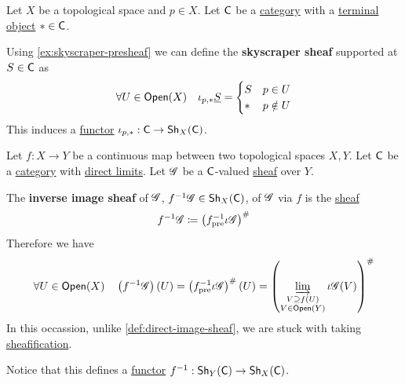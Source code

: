 \documentclass[../../../main]{subfiles}
\begin{document}
\begin{definition} \label{def:skyscraper-sheaf}
  Let \(X\) be a topological space and \(p \in X\).
  Let \(\mathsf{C}\) be a \hyperref[def:category]{category} with a \hyperref[def:initial-terminal-object]{terminal object} \(\ast \in \mathsf{C}\).

  Using \autoref{ex:skyscraper-presheaf} we can define the \textbf{skyscraper sheaf} supported at \(S \in \mathsf{C}\) as
  \begin{align*}
    \forall U \in \mathsf{Open}(X) \quad \iota_{p, \ast}\underline{S} = \begin{cases}
      S & p \in U \\
      \ast & p \notin U
    \end{cases}
  \end{align*}
  This induces a \hyperref[def:functor]{functor} \(\iota_{p, \ast}: \mathsf{C} \to \mathsf{Sh}_{X}(\mathsf{C})\).
\end{definition}

\begin{definition} \label{def:inverse-image-sheaf}
  Let \(f: X \to Y\) be a continuous map between two topological spaces \(X, Y\).
  Let \(\mathsf{C}\) be a \hyperref[def:category]{category} with \hyperref[def:direct-limit]{direct limits}.
  Let \(\mathscr{G}\) be a \(\mathsf{C}\)-valued \hyperref[def:sheaf]{sheaf} over \(Y\).

  The \textbf{inverse image sheaf} of \(\mathscr{G}\), \(f^{-1}\mathscr{G} \in \mathsf{Sh}_{X}(\mathsf{C})\), of \(\mathscr{G}\) via \(f\) is the \hyperref[def:sheaf]{sheaf}
  \begin{equation*}
    f^{-1}\mathscr{G} \coloneq \left( f_{\operatorname{pre}}^{-1} \iota \mathscr{G} \right)^{\#}
  \end{equation*}
  Therefore we have
  \begin{align*}
    \forall U \in \mathsf{Open}(X) \quad \left( f^{-1}\mathscr{G} \right)(U) = \left( f_{\operatorname{pre}}^{-1} \iota \mathscr{G} \right)^{\#}(U) = \left( \varinjlim_{\substack{V \supseteq f(U) \\ V \in \mathsf{Open}(Y)}} \iota\mathscr{G}(V) \right)^{\#}
  \end{align*}
  In this occassion, unlike \autoref{def:direct-image-sheaf}, we are stuck with taking \hyperref[def:sheafification]{sheafification}.

  Notice that this defines a \hyperref[def:functor]{functor} \(f^{-1}: \mathsf{Sh}_{Y}(\mathsf{C}) \to \mathsf{Sh}_{X}(\mathsf{C})\).
\end{definition}
\end{document}
